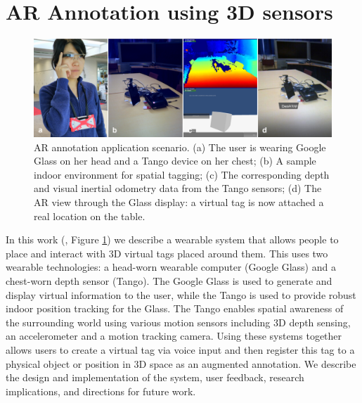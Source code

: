 
\section{AR Annotation using 3D sensors}
\label{sec:3D}

\begin{figure}[ht]
  \centering
  \includegraphics[width=\linewidth]{images/mgia15/sampleteaser-01.jpg}
  \caption{AR annotation application scenario. (a) The user is wearing Google Glass on her head and a Tango device on her chest; (b) A sample indoor environment for spatial tagging; (c) The corresponding depth and visual inertial odometry data from the Tango sensors; (d) The AR view through the Glass display: a virtual tag is now attached a real location on the table.}
  \label{fig:mgia15:teaser}
\end{figure}

In this work (\cite{Nassani2015a, Nassani2015}, Figure \ref{fig:mgia15:teaser}) we describe a wearable system that allows people to place and interact with 3D virtual tags placed around them. This uses two wearable technologies: a head-worn wearable computer (Google Glass) and a chest-worn depth sensor (Tango). The Google Glass is used to generate and display virtual information to the user, while the Tango is used to provide robust indoor position tracking for the Glass. The Tango enables spatial awareness of the surrounding world using various motion sensors including 3D depth sensing, an accelerometer and a motion tracking camera. Using these systems together allows users to create a virtual tag via voice input and then register this tag to a physical object or position in 3D space as an augmented annotation. We describe the design and implementation of the system, user feedback,  research implications, and directions for future work.  

